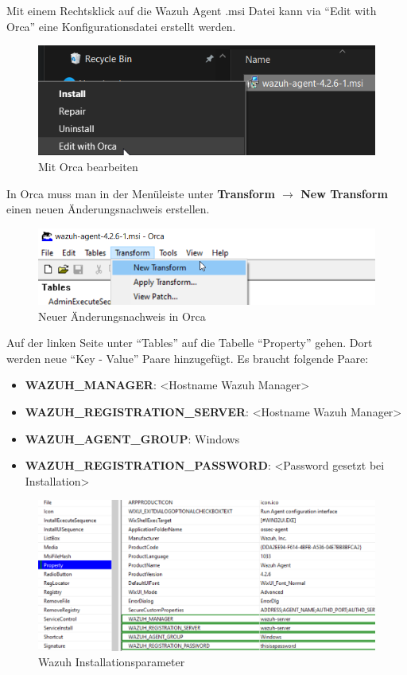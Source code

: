 Mit einem Rechtsklick auf die Wazuh Agent .msi Datei kann via ``Edit with Orca'' eine Konfigurationsdatei erstellt werden.
\begin{figure}[H]
    \centering
    \includegraphics[width=0.7\linewidth]{../img/agent/edit-with-orca.png}
    \caption{Mit Orca bearbeiten}
\end{figure}

In Orca muss man in der Menüleiste unter \textbf{Transform $\rightarrow$ New Transform} einen neuen Änderungsnachweis erstellen.
\begin{figure}[H]
    \centering
    \includegraphics[width=0.7\linewidth]{../img/agent/new-transform.png}
    \caption{Neuer Änderungsnachweis in Orca}
\end{figure}

Auf der linken Seite unter ``Tables'' auf die Tabelle ``Property'' gehen.
Dort werden neue ``Key - Value'' Paare hinzugefügt.
Es braucht folgende Paare:
\begin{itemize}
    \item \textbf{WAZUH\_MANAGER}: <Hostname Wazuh Manager>
    \item \textbf{WAZUH\_REGISTRATION\_SERVER}: <Hostname Wazuh Manager>
    \item \textbf{WAZUH\_AGENT\_GROUP}: Windows
    \item \textbf{WAZUH\_REGISTRATION\_PASSWORD}: <Password gesetzt bei Installation>
\end{itemize}

\begin{figure}[H]
    \centering
    \includegraphics[width=0.7\linewidth]{../img/agent/Orca-Edit.png}
    \caption{Wazuh Installationsparameter}
\end{figure}

